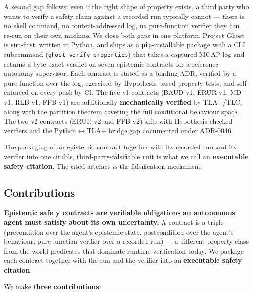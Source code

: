 \documentclass[acmsmall,nonacm=true,review=false]{acmart}
\theoremstyle{plain}
\begin{document}
A second gap follows: even if the right shape of property exists,
a third party who wants to verify a safety claim against a
recorded run typically cannot --- there is no shell command, no
content-addressed log, no pure-function verifier they can re-run
on their own machine. We close both gaps in one platform. Project
Ghost is sim-first, written in Python, and ships as a
\texttt{pip}-installable package with a CLI subcommand
(\texttt{ghost verify-properties}) that takes a captured MCAP log
and returns a byte-exact verdict on seven epistemic contracts for
a reference autonomy supervisor. Each contract is stated as a
binding ADR, verified by a pure function over the log, exercised
by Hypothesis-based property tests, and self-enforced on every
push by CI. The five v1 contracts (BAUD-v1, ERUR-v1, MD-v1,
RLB-v1, FPB-v1) are additionally \textbf{mechanically verified}
by TLA+/TLC, along with the partition theorem covering the full
conditional behaviour space. The two v2 contracts (ERUR-v2 and
FPB-v2) ship with Hypothesis-checked verifiers and the
Python$\leftrightarrow$TLA+ bridge gap documented under ADR-0046.

The packaging of an epistemic contract together with its recorded
run and its verifier into one citable, third-party-falsifiable
unit is what we call an \textbf{executable safety citation}. The
cited artefact \emph{is} the falsification mechanism.

\subsection{Contributions}
\label{sec:contributions}

\textbf{Epistemic safety contracts are verifiable obligations an
autonomous agent must satisfy about its own uncertainty.} A
contract is a triple (precondition over the agent's epistemic
state, postcondition over the agent's behaviour, pure-function
verifier over a recorded run) --- a different property class from
the world-predicates that dominate runtime verification today. We
package each contract together with the run and the verifier into
an \textbf{executable safety citation}.

We make \textbf{three contributions}:
\end{document}
